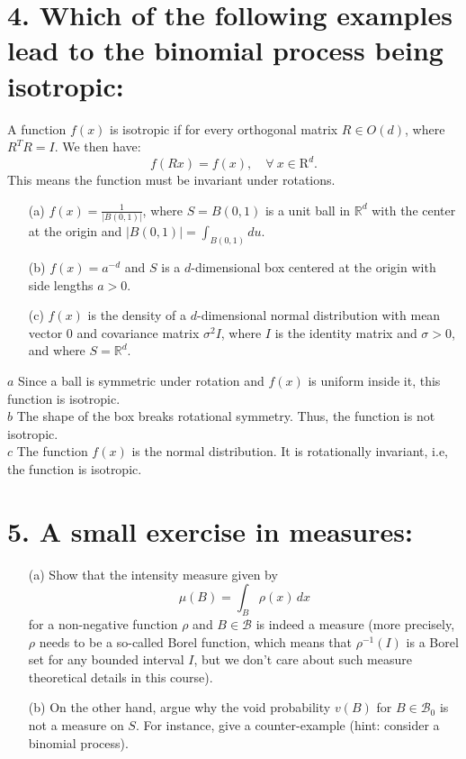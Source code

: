 \documentclass{article}
\begin{document}
\section*{4. Which of the following examples lead to the binomial process being isotropic:}
A function $f(x)$ is isotropic if for every orthogonal matrix $R \in O(d)$, where $R^T R=I$. We then have:
\[ 
f(Rx)=f(x), \quad \forall\  x\in \mathrm{R}^d.
\]
This means the function must be invariant under rotations.
\begin{enumerate}
    \item[(a)] $f(x) = \frac{1}{|B(0, 1)|}$, where $S = B(0, 1)$ is a unit ball in $\mathbb{R}^d$ with the center at the origin and $|B(0, 1)| = \int_{B(0,1)} du$. 
    
    \item[(b)] $f(x) = a^{-d}$ and $S$ is a $d$-dimensional box centered at the origin with side lengths $a > 0$.
    
    \item[(c)] $f(x)$ is the density of a $d$-dimensional normal distribution with mean vector 0 and covariance matrix $\sigma^2 I$, where $I$ is the identity matrix and $\sigma > 0$, and where $S = \mathbb{R}^d$.
\end{enumerate}
\(a\) Since a ball is symmetric under rotation and $f(x)$ is uniform inside it, this function is isotropic.\\
\(b\) The shape of the box breaks rotational symmetry. Thus, the function is not isotropic.\\
\(c\) The function $f(x)$ is the normal distribution. It is rotationally invariant, i.e, the function is isotropic.
\section*{5. A small exercise in measures:}
\begin{enumerate}
    \item[(a)] Show that the intensity measure given by
    \[
    \mu(B) = \int_B \rho(x) \, dx
    \]
    for a non-negative function $\rho$ and $B \in \mathcal{B}$ is indeed a measure (more precisely, $\rho$ needs to be a so-called Borel function, which means that $\rho^{-1}(I)$ is a Borel set for any bounded interval $I$, but we don’t care about such measure theoretical details in this course).
    
    \item[(b)] On the other hand, argue why the void probability $v(B)$ for $B \in \mathcal{B}_0$ is not a measure on $S$. For instance, give a counter-example (hint: consider a binomial process).
\end{enumerate}
\end{document}

